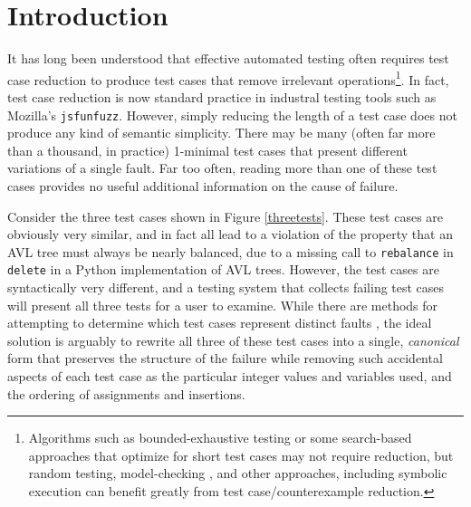 \section{Introduction}

It has long been understood that effective automated testing often requires
test case reduction \cite{DD,MinUnit,TCminim,ICSEDiff} to produce test cases
that remove irrelevant operations\footnote{Algorithms such as
  bounded-exhaustive testing \cite{SoftBET} or some search-based approaches that
  optimize for short test cases \cite{FA11} may not require reduction, but random
  testing, model-checking \cite{Gastin04minimizationof}, and other
  approaches, including symbolic execution \cite{issta14} can benefit greatly from
  test case/counterexample reduction.}.  In fact, test case reduction is
now standard practice in industral testing tools such as Mozilla's
{\tt jsfunfuzz}.  However, simply reducing the length of a test case
does not produce any kind of semantic simplicity.  There may be many
(often far more than a thousand, in practice) 1-minimal test cases
that present different variations of a single fault.  Far too often,
reading more than one of these test cases provides no useful
additional information on the cause of failure.

Consider the three test cases shown in Figure \ref{threetests}.  These
test cases are obviously very similar, and in fact all lead to a
violation of the property that an AVL tree must always be nearly
balanced, due to a missing call to {\tt rebalance} in {\tt delete} in
a Python implementation of AVL trees.  However, the test cases are
syntactically very different, and a testing system that collects
failing test cases will present all three tests for a user to examine.
While there are methods for attempting to determine which test cases
represent distinct faults \cite{PLDI13}, the ideal solution is
arguably to rewrite all three of these test cases into a single,
\emph{canonical} form that preserves the structure of the failure while removing
such accidental aspects of each test case as the particular integer
values and variables used, and the ordering of assignments and
insertions.

